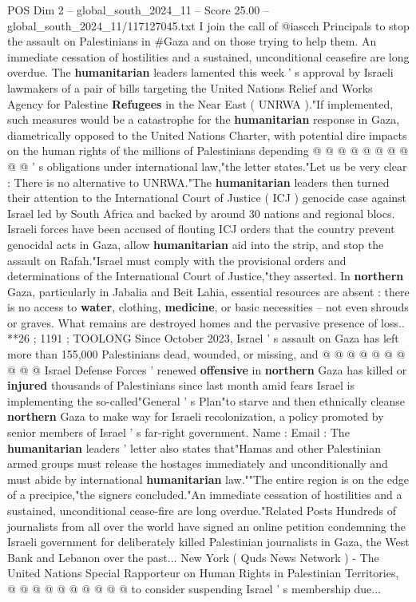 \begin{textsample}{POS Dim 2 – global\_south\_2024\_11 – Score 25.00 – global\_south\_2024\_11/117127045.txt}
I join the call of @iascch Principals to stop the assault on Palestinians in \#Gaza and on those trying to help them.
An immediate cessation of hostilities and a sustained, unconditional ceasefire are long overdue.
The \textbf{humanitarian} leaders lamented this week ' s approval by Israeli lawmakers of a pair of bills targeting the United Nations Relief and Works Agency for Palestine \textbf{Refugees} in the Near East ( UNRWA )."If implemented, such measures would be a catastrophe for the \textbf{humanitarian} response in Gaza, diametrically opposed to the United Nations Charter, with potential dire impacts on the human rights of the millions of Palestinians depending @ @ @ @ @ @ @ @ @ @ ' s obligations under international law,"the letter states."Let us be very clear : There is no alternative to UNRWA."The \textbf{humanitarian} leaders then turned their attention to the International Court of Justice ( ICJ ) genocide case against Israel led by South Africa and backed by around 30 nations and regional blocs.
Israeli forces have been accused of flouting ICJ orders that the country prevent genocidal acts in Gaza, allow \textbf{humanitarian} aid into the strip, and stop the assault on Rafah."Israel must comply with the provisional orders and determinations of the International Court of Justice,"they asserted.
In \textbf{northern} Gaza, particularly in Jabalia and Beit Lahia, essential resources are absent : there is no access to \textbf{water}, clothing, \textbf{medicine}, or basic necessities -- not even shrouds or graves.
What remains are destroyed homes and the pervasive presence of loss.. **26 ; 1191 ; TOOLONG Since October 2023, Israel ' s assault on Gaza has left more than 155,000 Palestinians dead, wounded, or missing, and @ @ @ @ @ @ @ @ @ @ Israel Defense Forces ' renewed \textbf{offensive} in \textbf{northern} Gaza has killed or \textbf{injured} thousands of Palestinians since last month amid fears Israel is implementing the so-called"General ' s Plan"to starve and then ethnically cleanse \textbf{northern} Gaza to make way for Israeli recolonization, a policy promoted by senior members of Israel ' s far-right government.
Name : Email : The \textbf{humanitarian} leaders ' letter also states that"Hamas and other Palestinian armed groups must release the hostages immediately and unconditionally and must abide by international \textbf{humanitarian} law.""The entire region is on the edge of a precipice,"the signers concluded."An immediate cessation of hostilities and a sustained, unconditional cease-fire are long overdue."Related Posts Hundreds of journalists from all over the world have signed an online petition condemning the Israeli government for deliberately killed Palestinian journalists in Gaza, the West Bank and Lebanon over the past...
New York ( Quds News Network ) - The United Nations Special Rapporteur on Human Rights in Palestinian Territories, @ @ @ @ @ @ @ @ @ @ to consider suspending Israel ' s membership due...

\end{textsample}
